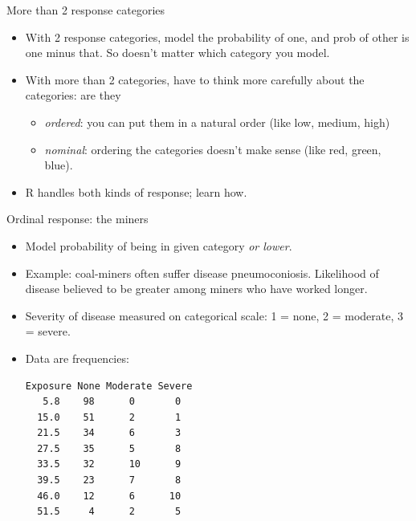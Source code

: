 \begin{frame}{More than 2 response categories}

  \begin{itemize}
  \item With 2 response categories, model the probability of one, and prob of other is one minus that. So doesn't matter which category you model.
  \item With more than 2 categories, have to think more carefully about the categories: are they
    \begin{itemize}
    \item {\em ordered}: you can put them in a natural order (like low, medium, high)
    \item {\em nominal}: ordering the categories doesn't make sense (like red, green, blue).
    \end{itemize}
  \item R handles both kinds of response; learn how.
  \end{itemize}
  
\end{frame}

\begin{frame}[fragile]{Ordinal response: the miners}


  \begin{itemize}
  \item 
Model probability of being in given category {\em or lower}.
\item Example: coal-miners often suffer disease pneumoconiosis. Likelihood of disease believed to be greater 
among miners who have worked longer. 
\item Severity of disease measured on categorical scale: 1 = none, 2
= moderate, 3 = severe.
\item Data are frequencies:
\begin{verbatim}
Exposure None Moderate Severe
   5.8    98      0       0
  15.0    51      2       1
  21.5    34      6       3
  27.5    35      5       8
  33.5    32      10      9
  39.5    23      7       8
  46.0    12      6      10
  51.5     4      2       5
\end{verbatim}
  
\end{itemize}
\end{frame}

